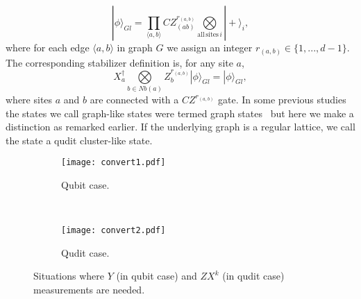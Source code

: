 \documentclass[aps,amsfonts,pra,twocolumn,showpacs]{revtex4-1}
\newcommand{\be}{\begin{equation}}
\newcommand{\ee}{\end{equation}}
\begin{document}
		\be \label{eq:Gl}
		|\phi\rangle_{Gl} = \prod_{\langle a, b\rangle} CZ_{(ab)}^{r_{(a, b)}} \underset{\mathrm{all \, sites} \, i}{\bigotimes} |+\rangle_i,
		\ee
	where for each edge $\langle a, b\rangle$ in graph $G$ we assign an integer $r_{(a, b)} \in \{1, ..., d-1\}$. The corresponding stabilizer definition is, for any site $a$,
		\be
		X_a^\dagger \underset{b \in Nb(a)}{\bigotimes} Z_b^{r_{(a, b)}} |\phi\rangle_{Gl} = |\phi\rangle_{Gl},
		\label{stabilizer}
		\ee
	where sites $a$ and $b$ are connected with a $CZ^{r_{(a, b)}}$ gate. In some previous studies the states we call graph-like states were termed graph states~\cite{Bahramgiri2007, Looi2008, Keet2010, Helwig2013} but here we make a distinction as remarked earlier. If the underlying graph is a regular lattice, we call the state a qudit cluster-like state.
	
	\begin{figure}[h]
		\centering
		\begin{subfigure}{0.45\textwidth}
			\centering
			\texttt{[image: convert1.pdf]}
			\caption{Qubit case.}
		\end{subfigure} \\
		\vspace{2mm}
		\begin{subfigure}{0.45\textwidth}
			\centering
			\texttt{[image: convert2.pdf]}
			\caption{Qudit case.}
		\end{subfigure}
		\caption{Situations where $Y$ (in qubit case) and $ZX^k$ (in qudit case) measurements are needed.} \label{convert}
	\end{figure}
	
\end{document}
